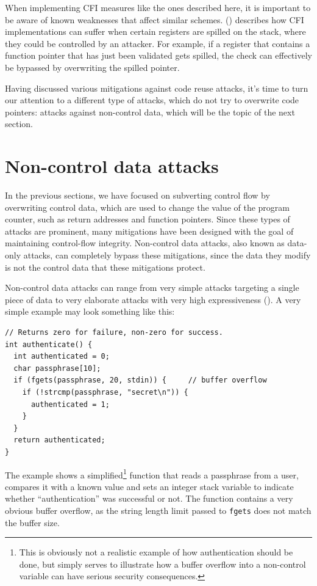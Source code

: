 \documentclass[
  a4paper,
]{report}
\begin{document}
When implementing CFI measures like the ones described here, it is
important to be aware of known weaknesses that affect similar schemes.
() describes how CFI
implementations can suffer when certain registers are spilled on the
stack, where they could be controlled by an attacker. For example, if a
register that contains a function pointer that has just been validated
gets spilled, the check can effectively be bypassed by overwriting the
spilled pointer.

Having discussed various mitigations against code reuse attacks, it's
time to turn our attention to a different type of attacks, which do not
try to overwrite code pointers: attacks against non-control data, which
will be the topic of the next section.

\section{Non-control data attacks}\label{non-control-data-attacks}

In the previous sections, we have focused on subverting control flow by
overwriting \label{__index_entry_60}{control
data}, which are used to change the value of the
program counter, such as return addresses and function pointers. Since
these types of attacks are prominent, many mitigations have been
designed with the goal of maintaining control-flow integrity.
\label{__index_entry_61}{Non-control data
attacks}, also known as
\label{__index_entry_62}{data-only
attacks}, can completely bypass these
mitigations, since the data they modify is not the control data that
these mitigations protect.

Non-control data attacks can range from very simple attacks targeting a
single piece of data to very elaborate attacks with very high
expressiveness (). A very
simple example may look something like this:

\begin{verbatim}
// Returns zero for failure, non-zero for success.
int authenticate() {
  int authenticated = 0;
  char passphrase[10];
  if (fgets(passphrase, 20, stdin)) {     // buffer overflow
    if (!strcmp(passphrase, "secret\n")) {
      authenticated = 1;
    }
  }
  return authenticated;
}
\end{verbatim}

The example shows a simplified\footnote{This is obviously not a
  realistic example of how authentication should be done, but simply
  serves to illustrate how a buffer overflow into a non-control variable
  can have serious security consequences.} function that reads a
passphrase from a user, compares it with a known value and sets an
integer stack variable to indicate whether ``authentication'' was
successful or not. The function contains a very obvious buffer overflow,
as the string length limit passed to \texttt{fgets} does not match the
buffer size.
\end{document}
